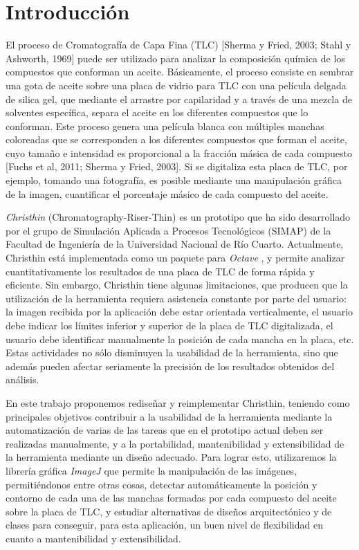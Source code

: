 \chapter{Introducci\'on}
El proceso de Cromatograf\'ia de Capa Fina (TLC) [Sherma y Fried, 2003; Stahl y Ashworth, 1969] puede ser utilizado para analizar la composici\'on qu\'imica de los compuestos que conforman un aceite. B\'asicamente, el proceso consiste en sembrar una gota de aceite sobre una placa de vidrio para TLC con una pel\'icula delgada de silica gel, que mediante el arrastre por capilaridad y a trav\'es de una mezcla de solventes espec\'ifica, separa el aceite en los diferentes compuestos que lo conforman. Este proceso genera una pel\'icula blanca con m\'ultiples manchas coloreadas que se corresponden a los diferentes compuestos que forman el aceite, cuyo tama\~no e intensidad es proporcional a la fracci\'on m\'asica de cada compuesto [Fuchs et al, 2011; Sherma y Fried,  2003]. Si se digitaliza esta placa de TLC, por ejemplo, tomando una fotograf\'ia, es posible mediante una manipulaci\'on gr\'afica de la imagen, cuantificar el porcentaje m\'asico de cada compuesto del aceite.
 
\textit{Christhin} (Chromatography-Riser-Thin) \cite{christin} es un prototipo que ha sido desarrollado por el grupo de Simulaci\'on Aplicada a Procesos Tecnol\'ogicos (SIMAP) de la Facultad de Ingenier\'ia de la Universidad Nacional de R\'io Cuarto. Actualmente, Christhin est\'a implementada como  un paquete para \textit{Octave} \cite{octave}, y permite analizar cuantitativamente los resultados de una placa de TLC de forma r\'apida y eficiente. Sin embargo, Christhin tiene algunas limitaciones, que producen que la utilizaci\'on de la herramienta requiera asistencia constante por parte del usuario: la imagen recibida por la aplicaci\'on debe estar orientada verticalmente, el usuario debe indicar los l\'imites inferior y superior de la placa de TLC digitalizada, el usuario debe identificar manualmente la posici\'on de cada mancha en la placa, etc. Estas actividades no s\'olo disminuyen la usabilidad de la herramienta, sino que adem\'as pueden afectar seriamente la precisi\'on de los resultados obtenidos del an\'alisis. 

En este trabajo proponemos redise\~nar y reimplementar Christhin, teniendo como principales objetivos contribuir a la usabilidad de la herramienta mediante la automatizaci\'on de varias de las tareas que en el prototipo actual deben ser realizadas manualmente, y a la portabilidad, mantenibilidad y extensibilidad de la herramienta mediante un dise\~no adecuado. Para lograr esto, utilizaremos la librer\'ia gr\'afica \textit{ImageJ} \cite{imagej} que permite la manipulaci\'on de las im\'agenes, permiti\'endonos entre otras cosas, detectar autom\'aticamente la posici\'on y contorno de cada una de las manchas formadas por cada compuesto del aceite sobre la placa de TLC, y estudiar alternativas de dise\~nos arquitect\'onico y de clases para conseguir, para esta aplicaci\'on, un buen nivel de flexibilidad en cuanto a mantenibilidad y extensibilidad.

